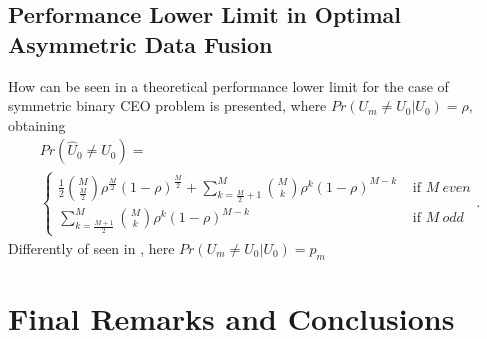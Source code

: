 \documentclass[journal]{IEEEtran}
\begin{document}
\subsection{Performance Lower Limit in Optimal Asymmetric Data Fusion}
How can be seen in \cite{ceobinary1,ceobinary2} a theoretical performance lower 
limit for the case of symmetric binary CEO problem is presented, where 
$Pr(U_m \neq U_0 | U_0)=\rho$, obtaining 
\small
\begin{equation}\label{eq:symlimit}
\begin{matrix}
 Pr(\hat{U}_0 \neq U_0)=\\
\begin{cases}
\frac{1}{2} \binom{M}{\frac{M}{2}}{\rho}^{\frac{M}{2}}{(1-\rho)}^{\frac{M}{2}}+\sum \limits_{k=\frac{M}{2}+1}^{M} \binom{M}{k}{\rho}^{k}{(1-\rho)}^{M-k} & \text{ if } M~even \\ 
\sum \limits_{k=\frac{M+1}{2}}^{M} \binom{M}{k}{\rho}^{k}{(1-\rho)}^{M-k} & \text{ if } M~odd
\end{cases}.
\end{matrix}
\end{equation}
\normalfont
Differently of seen in \cite{ceobinary1,ceobinary2}, here $Pr(U_m \ne U_0 | U_0)=p_m$



\section{Final Remarks and Conclusions} 
\label{sec:Conclusions}
\end{document}
